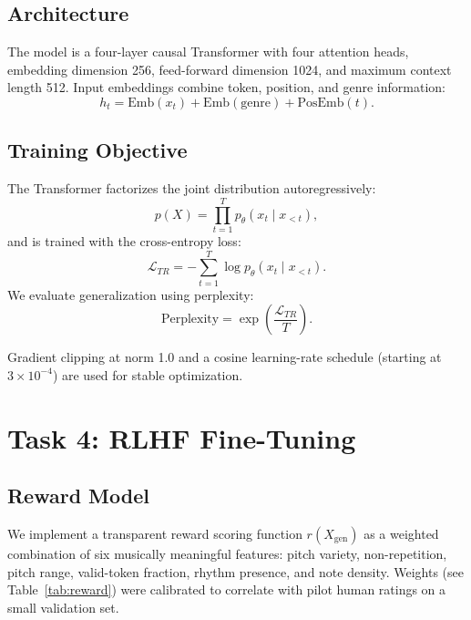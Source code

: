 \documentclass[conference]{IEEEtran}
\begin{document}
\subsection{Architecture}
The model is a four-layer causal Transformer with four attention heads,
embedding dimension 256, feed-forward dimension 1024, and maximum context
length 512. Input embeddings combine token, position, and genre
information:
\begin{equation}
h_t = \text{Emb}(x_t) + \text{Emb}(\text{genre}) + \text{PosEmb}(t).
\end{equation}

\subsection{Training Objective}
The Transformer factorizes the joint distribution autoregressively:
\begin{equation}
p(X) = \prod_{t=1}^{T} p_\theta(x_t \mid x_{<t}),
\end{equation}
and is trained with the cross-entropy loss:
\begin{equation}
\mathcal{L}_{TR} = -\sum_{t=1}^{T} \log p_\theta(x_t \mid x_{<t}).
\end{equation}
We evaluate generalization using perplexity:
\begin{equation}
\text{Perplexity} = \exp\!\left(\frac{\mathcal{L}_{TR}}{T}\right).
\end{equation}

Gradient clipping at norm 1.0 and a cosine learning-rate schedule
(starting at $3 \times 10^{-4}$) are used for stable optimization.

\section{Task 4: RLHF Fine-Tuning} \label{sec:task4}

\subsection{Reward Model}
We implement a transparent reward scoring function $r(X_{\text{gen}})$ as a
weighted combination of six musically meaningful features: pitch variety,
non-repetition, pitch range, valid-token fraction, rhythm presence, and
note density. Weights (see Table~\ref{tab:reward}) were calibrated to
correlate with pilot human ratings on a small validation set.
\end{document}
